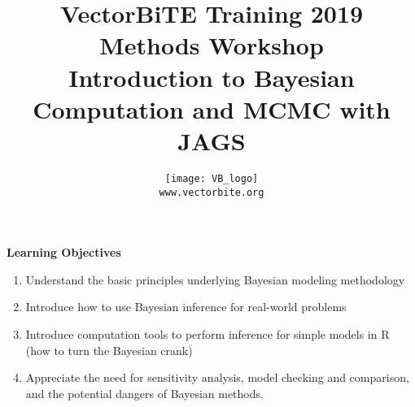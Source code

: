 \documentclass[12pt,xcolor=svgnames]{beamer}
\newcommand{\rd}{\color{red}}
\newcommand{\org}{\color{Orange}}
\newcommand{\gr}{\color{gray}}
\newcommand{\theme}{\color{FireBrick}}
\newcommand{\sk}{\vspace{.4cm}}
\newcommand{\chap}[1]{{\theme \Large \bf #1} \sk}
\begin{document}
{ \usebackgroundtemplate{}%
\thispagestyle{empty}
\setcounter{page}{0}


\title{\theme \Large \vskip 0.5cm
{\bf VectorBiTE Training 2019 \\ Methods Workshop}\\
\bigskip
\bf {\sf \gr Introduction to Bayesian Computation and MCMC with JAGS}}

\author{
\begin{center}
\texttt{[image: VB\_logo]}
\end{center}
\texttt{\rd\small www.vectorbite.org}
}
\date{}
\maketitle 
}



\begin{frame}
\chap{Learning Objectives}

\begin{enumerate}
\item Understand the basic principles underlying Bayesian modeling methodology
\item  Introduce how to use Bayesian inference for real-world problems
\item Introduce computation tools to perform inference for simple models in R (how to turn the Bayesian crank)
\item Appreciate the need for sensitivity analysis, model checking and comparison, and the potential dangers of Bayesian methods.
\end{enumerate}

\end{frame}
\end{document}
